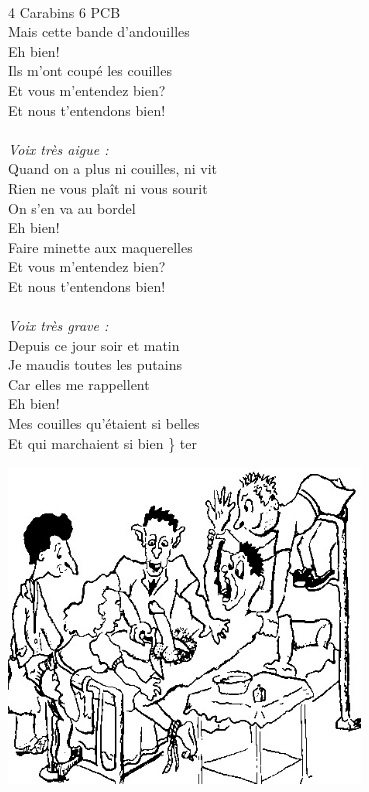 \\4 Carabins 6 PCB \bissimple
\\Mais cette bande d'andouilles
\\Eh bien!
\\Ils m'ont coupé les couilles
\\Et vous m'entendez bien?
\\Et nous t'entendons bien!
\\\\\textit{Voix très aigue :}
\\Quand on a plus ni couilles, ni vit \bissimple
\\Rien ne vous plaît ni vous sourit \bissimple
\\On s'en va au bordel
\\Eh bien!
\\Faire minette aux maquerelles
\\Et vous m'entendez bien?
\\Et nous t'entendons bien!
\\\\\textit{Voix très grave :}
\\Depuis ce jour soir et matin \bissimple
\\Je maudis toutes les putains \bissimple
\\Car elles me rappellent
\\Eh bien!
\\Mes couilles qu'étaient si belles
\\Et qui marchaient si bien \}  ter
\begin{center}
   \includegraphics[width=0.7\textwidth]{images/cuvier.jpg}
 \end{center}

\breakpage